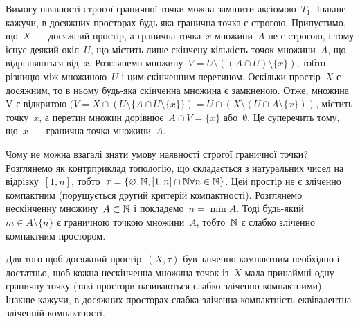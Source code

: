 \begin{remark}
    Вимогу наявності строгої граничної точки можна замінити аксіомою~$T_1$. Інакше кажучи, в досяжних просторах будь-яка гранична точка є строгою. Припустимо, що~$X$~--- досяжний простір, а гранична точка~$x$ множини~$A$ не є строгою, і тому існує деякий окіл~$U$, що містить лише скінчену кількість точок множини~$A$, що відрізняються від~$x$. Розглянемо множину~$V = U \setminus ((A \cap U) \setminus \{x\})$, тобто різницю між множиною~$U$ і цим скінченним перетином. Оскільки простір~$X$ є досяжним, то в ньому будь-яка скінченна множина є замкненою. Отже, множина V є відкритою $(V = X \cap (U \setminus \{A \cap U \setminus \{x\}\}) = U \cap (X \setminus (U \cap A \setminus \{x\}))$, містить точку~$x$, а перетин множин дорівнює~$A \cap V = \{x\}$ або~$\emptyset$. Це суперечить тому, що~$x$~--- гранична точка множини~$A$.
\end{remark}

\begin{remark}
    Чому не можна взагалі зняти умову наявності строгої граничної точки? Розглянемо як контрприклад топологію, що складається з натуральних чисел на відрізку~$[1, n]$, тобто~$\tau = \{\varnothing, \mathbb{N}, [1, n] \cap \mathbb{N} \forall n \in \mathbb{N}\}$. Цей простір не є зліченно компактним (порушується другий критерій компактності). Розглянемо нескінченну множину~$A \subset \mathbb{N}$ і покладемо~$n = \min A$. Тоді будь-який~$m \in A \setminus \{n\}$ є граничною точкою множини~$A$, тобто~$\mathbb{N}$ є слабко зліченно компактним простором.
\end{remark}

\begin{theorem}
    Для того щоб досяжний простір~$(X, \tau)$ був зліченно компактним необхідно і достатньо, щоб кожна нескінченна множина точок із~$X$ мала принаймні одну граничну точку (такі простори називаються слабко зліченно компактними). Інакше кажучи, в досяжних просторах слабка зліченна компактність еквівалентна зліченній компактності.
\end{theorem}

